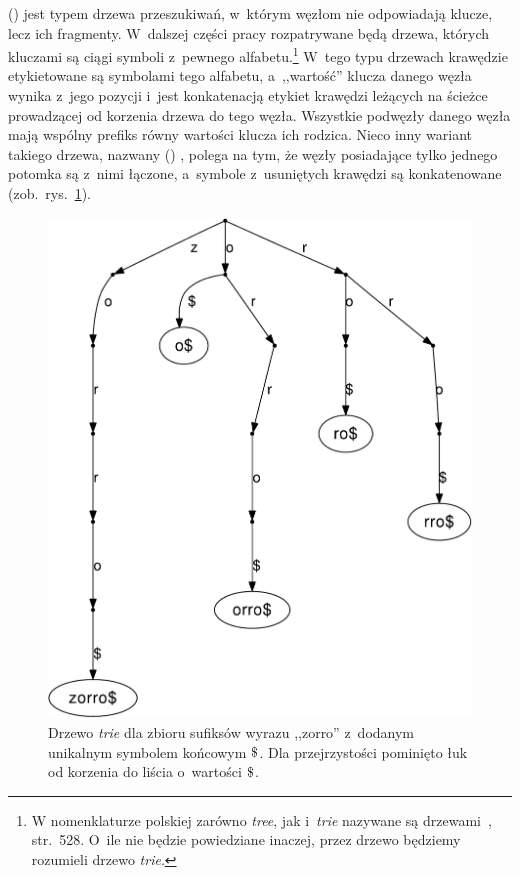  () \cite{larsson99structures} jest typem
drzewa przeszukiwań, w~którym węzłom nie odpowiadają klucze, lecz ich fragmenty. W~dalszej
części pracy rozpatrywane będą drzewa, których kluczami są ciągi
symboli z~pewnego alfabetu.\footnote{W nomenklaturze polskiej zarówno 
\emph{tree}, jak i~\emph{trie} nazywane są drzewami~\cite{pknuthv3}, str.~528.
O~ile nie będzie powiedziane inaczej, przez drzewo będziemy
rozumieli drzewo \emph{trie}.} W~tego typu drzewach
krawędzie etykietowane są symbolami tego alfabetu, a~,,wartość'' klucza danego węzła wynika z~jego
pozycji i~jest konkatenacją etykiet krawędzi leżących na ścieżce prowadzącej
od korzenia drzewa do tego węzła. Wszystkie podwęzły danego
węzła mają wspólny prefiks równy wartości klucza ich rodzica.       
Nieco inny wariant takiego drzewa, nazwany 
() \cite{larsson99structures}, polega na tym, że węzły
posiadające tylko jednego potomka są z~nimi łączone, a~symbole z~usuniętych
krawędzi są konkatenowane (zob.~rys.~\ref{rys:tree}). 

\begin{figure}[t]
    \begin{center}
       \includegraphics[scale=0.5]{figures/zorroSTrie.pdf}
    \end{center}

    \caption{Drzewo \emph{trie} dla zbioru sufiksów wyrazu ,,zorro'' z~dodanym unikalnym
    symbolem końcowym $\dollar$. Dla
    przejrzystości pominięto łuk od korzenia do liścia o~wartości $\dollar$.}%
    \label{rys:tree}
\end{figure}

